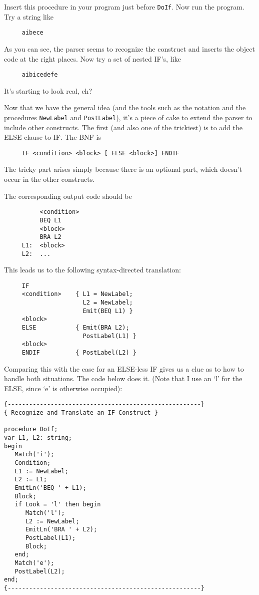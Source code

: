 Insert this procedure in your program just before {\tt DoIf}. Now run the program. Try a string like

\begin{verbatim}
     aibece
\end{verbatim}

As you can see, the  parser seems to recognize the construct and inserts the object code at the  right  places. Now try a set of nested IF's, like

\begin{verbatim}
     aibicedefe
\end{verbatim}

It's starting to look real, eh?

Now that we  have  the  general  idea  (and the tools such as the notation and the procedures {\tt NewLabel} and {\tt PostLabel}), it's a piece of cake to extend the parser to include other  constructs. The first (and also one of the  trickiest)  is to add the ELSE clause to IF. The BNF is

\begin{verbatim}
     IF <condition> <block> [ ELSE <block>] ENDIF
\end{verbatim}

The tricky part arises simply  because there is an optional part, which doesn't occur in the other constructs.

The corresponding output code should be

\begin{verbatim}
          <condition>
          BEQ L1
          <block>
          BRA L2
     L1:  <block>
     L2:  ...
\end{verbatim}

This leads us to the following syntax-directed translation:

\begin{verbatim}
     IF
     <condition>    { L1 = NewLabel;
                      L2 = NewLabel;
                      Emit(BEQ L1) }
     <block>
     ELSE           { Emit(BRA L2);
                      PostLabel(L1) }
     <block>
     ENDIF          { PostLabel(L2) }
\end{verbatim}

Comparing this with the case for an ELSE-less IF gives us  a clue as to how to handle both situations. The  code  below  does it. (Note that I  use  an  `l'  for  the ELSE, since `e' is otherwise occupied):

\begin{verbatim}
{------------------------------------------------------}
{ Recognize and Translate an IF Construct }

procedure DoIf;
var L1, L2: string;
begin
   Match('i');
   Condition;
   L1 := NewLabel;
   L2 := L1;
   EmitLn('BEQ ' + L1);
   Block;
   if Look = 'l' then begin
      Match('l');
      L2 := NewLabel;
      EmitLn('BRA ' + L2);
      PostLabel(L1);
      Block;
   end;
   Match('e');
   PostLabel(L2);
end;
{------------------------------------------------------}
\end{verbatim}


